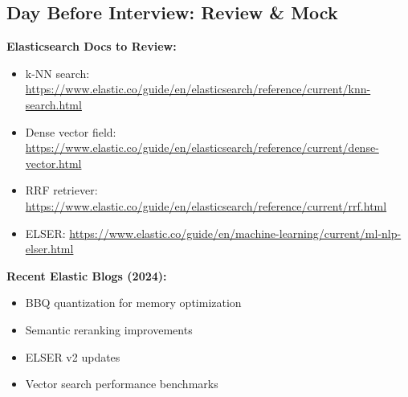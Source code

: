 \documentclass[10pt]{article}
\begin{document}
\subsection{Day Before Interview: Review \& Mock}

\textbf{Elasticsearch Docs to Review:}
\begin{itemize}
\item k-NN search: \url{https://www.elastic.co/guide/en/elasticsearch/reference/current/knn-search.html}
\item Dense vector field: \url{https://www.elastic.co/guide/en/elasticsearch/reference/current/dense-vector.html}
\item RRF retriever: \url{https://www.elastic.co/guide/en/elasticsearch/reference/current/rrf.html}
\item ELSER: \url{https://www.elastic.co/guide/en/machine-learning/current/ml-nlp-elser.html}
\end{itemize}

\textbf{Recent Elastic Blogs (2024):}
\begin{itemize}
\item BBQ quantization for memory optimization
\item Semantic reranking improvements
\item ELSER v2 updates
\item Vector search performance benchmarks
\end{itemize}
\end{document}
